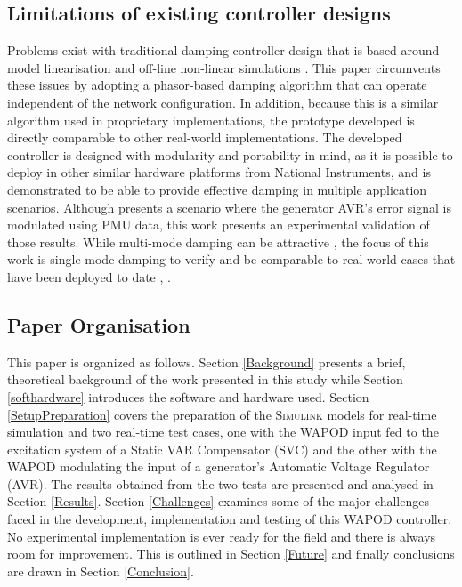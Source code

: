 \documentclass{ieeeaccess}
\begin{document}
\subsection{Limitations of existing controller designs}
Problems exist with traditional damping controller design that is based around model linearisation and off-line non-linear simulations \cite{WAPODChina}. This paper circumvents these issues by adopting a phasor-based damping algorithm \cite{PhasorPOD} that can operate independent of the network configuration. In addition, because this is a similar algorithm used in proprietary implementations\cite{WAPODNorway}, the prototype developed is directly comparable to other real-world implementations. The developed controller is designed with modularity and portability in mind, as it is possible to deploy in other similar hardware platforms from National Instruments, and is demonstrated to be able to provide effective damping in multiple application scenarios. Although \cite{Yuwa} presents a scenario where the generator AVR\rq{s} error signal is modulated using PMU data, this work presents an experimental validation of those results. While multi-mode damping can be attractive \cite{Kamwa}, the focus of this work is  single-mode damping to verify and be comparable to real-world cases that have been deployed to date \cite{WAPODNorway}, \cite{WAPODChina} .

\subsection{Paper Organisation}

This paper is organized as follows. Section \ref{Background} presents a brief, theoretical background of the work presented in this study while Section \ref{softhardware} introduces the software and hardware used. Section \ref{SetupPreparation} covers the preparation of the \textsc{Simulink} models for real-time simulation and two real-time test cases, one with the WAPOD input fed to the excitation system of a Static VAR Compensator (SVC) and the other with the WAPOD modulating the input of a generator\rq{s} Automatic Voltage Regulator (AVR). The results obtained from the two tests are presented and analysed in Section \ref{Results}. Section \ref{Challenges} examines some of the major challenges faced in the development, implementation and testing of this WAPOD controller. No experimental implementation is ever ready for the field and there is always room for improvement. This is outlined in Section \ref{Future} and finally conclusions are drawn in Section \ref{Conclusion}.
\end{document}
